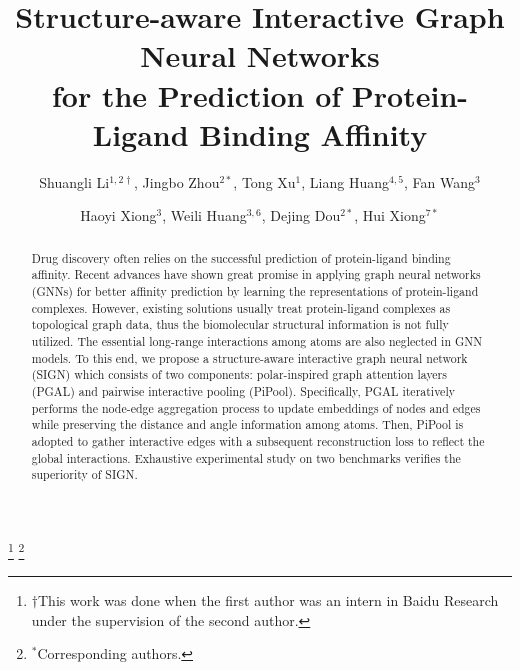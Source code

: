 \documentclass[sigconf]{acmart}
\newcommand{\model}{\textsf{SIGN}\xspace}
\newcommand{\gnn}{PGAL\xspace}
\newcommand{\pool}{PiPool\xspace}
\begin{document}
\fancyhead{}


\title{Structure-aware Interactive Graph Neural Networks \\ for the Prediction of Protein-Ligand Binding Affinity}

\author{Shuangli Li{$\scriptstyle ^{1,2\dagger}$}, Jingbo Zhou{$\scriptstyle ^{2*}$}, Tong Xu{$\scriptstyle ^{1}$}, Liang Huang{$\scriptstyle ^{4,5}$}, Fan Wang{$\scriptstyle ^{3}$}}
\author{Haoyi Xiong{$\scriptstyle ^{3}$}, Weili Huang{$\scriptstyle ^{3,6}$}, Dejing Dou{$\scriptstyle ^{2*}$}, Hui Xiong{$\scriptstyle^{7*}$}}
\thanks{$\dagger$This work was done when the first author was an intern in Baidu Research under the supervision of the second author.}
\thanks{$^*$Corresponding authors.}







\begin{abstract} \label{sec-abstract}





Drug discovery often relies on the successful prediction of protein-ligand binding affinity. Recent advances have shown great promise in applying graph neural networks (GNNs) for better affinity prediction by learning the representations of protein-ligand complexes. However, existing solutions usually treat protein-ligand complexes as topological graph data, thus the biomolecular structural information is not fully utilized. The essential long-range interactions among atoms are also neglected in GNN models. To this end, we propose a structure-aware interactive graph neural network (\model) which consists of two components: polar-inspired graph attention layers (\gnn) and pairwise interactive pooling (\pool).  Specifically, \gnn iteratively performs the node-edge aggregation process to update embeddings of nodes and edges while preserving the distance and angle information among atoms. Then, \pool is adopted to gather interactive edges with a subsequent reconstruction loss to reflect the global interactions. 
Exhaustive experimental study on two benchmarks verifies the superiority of \model.







\end{abstract}
\end{document}

